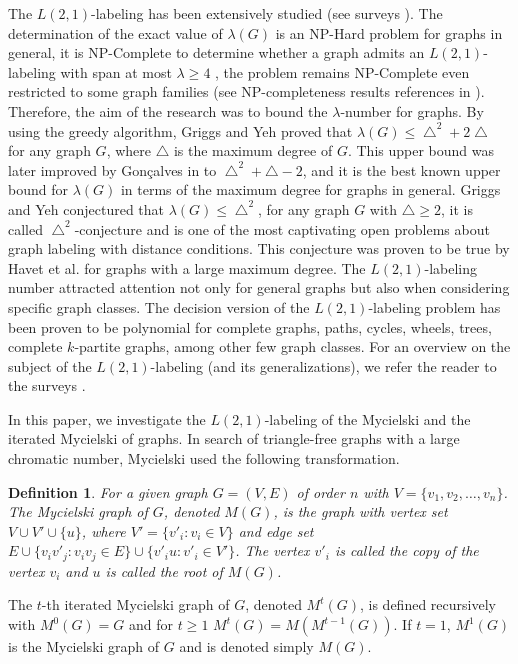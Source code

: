 \documentclass{article}
\newtheorem{dnt} {Definition}
\newtheorem{open problem} {Open Problem}
\numberwithin{lemma}{section}
\numberwithin{theorem}{section}
\numberwithin{cor}{section}
\numberwithin{prop}{section}
\numberwithin{con}{section}
\numberwithin{claim}{section}
\numberwithin{obs}{section}
\numberwithin{dnt}{section}
\begin{document}
\par The $L(2,1)$-labeling has been extensively studied (see surveys \cite{tiziana,yeh}). The determination of the exact value of $\lambda(G)$ is an NP-Hard problem for graphs in general, it is NP-Complete to determine whether a graph admits an $L(2,1)$-labeling with span at most $\lambda \geq 4$ \cite{fiala}, the problem remains NP-Complete even restricted to some graph families (see NP-completeness results references in \cite{tiziana}). Therefore, the aim of the research was to bound the $\lambda$-number for graphs. By using the greedy algorithm, Griggs and Yeh \cite{griggs} proved that  $\lambda(G)\leq \bigtriangleup^2+2\bigtriangleup$ for any graph $G$, where $\bigtriangleup$ is the maximum degree of $G$. This upper bound was later improved by Gon\c{c}alves  in \cite{goncal} to $\bigtriangleup^2+\bigtriangleup-2$, and it is the best known upper bound for $\lambda(G)$ in terms of the maximum degree for graphs in general. Griggs and Yeh \cite{griggs} conjectured that $\lambda(G)\leq \bigtriangleup^2$,   for any graph $G$ with $\bigtriangleup\geq 2$, it is called $\bigtriangleup^2$-conjecture and is one of the most captivating open problems about graph labeling with distance conditions. This conjecture was proven to be true by Havet et al. \cite{havet} for graphs with a large maximum degree. The $L(2,1)$-labeling number attracted attention not only for general graphs but also when considering specific graph classes. The decision version of the $L(2, 1)$-labeling problem has been proven to be polynomial for complete graphs, paths, cycles, wheels, trees, complete $k$-partite graphs, among other few graph classes. For an overview on the subject of the $L(2,1)$-labeling (and its generalizations), we refer the reader to the surveys \cite{tiziana,yeh}.
\par In this paper, we investigate the $L(2, 1)$-labeling of the Mycielski and the iterated Mycielski of graphs. In search of triangle-free graphs with a large chromatic number, Mycielski \cite{mycielski} used the following transformation.
\begin{dnt}\label{def1}
	For a given graph $G=(V, E)$ of order $n$ with $V=\{v_1,v_2,\ldots,v_n\}$. The Mycielski graph of $G$,  denoted $M(G)$, is the graph with vertex set $V\cup V'\cup \{u\}$, where $V'=\{v'_i : v_i \in V\}$ and edge set $E \cup \{v_iv'_j : v_iv_j \in E\} \cup \{v'_iu : v'_i \in V'\}$. The vertex $v'_i$ is called the copy of the vertex $v_i$ and $u$ is called the root of $M (G)$.	
\end{dnt}
The $t$-th iterated Mycielski graph of $G$, denoted $M^t (G)$, is defined recursively with $M^0(G)=G$ and for $t\geq 1$ $M^t(G)=M(M^{t-1}(G))$. If $t=1$, $M^1(G)$ is the Mycielski graph of $G$ and is denoted simply $M(G)$.
\end{document}
